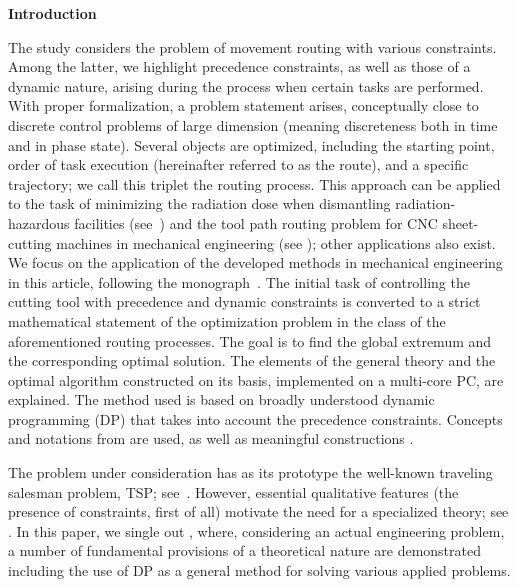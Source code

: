 \renewcommand{\theequation}{\arabic{section}.\arabic{equation}}

\newcommand{\pX}{{\mathcal X}}
\let\msf=\mathsf
\newcommand{\var}{\mathop{\sf Var}}
\setcounter{page}{1} %



\titleeng
\annotationandkeywordseng

\begin{flushleft}
  {\bf{Introduction}}
\end{flushleft}

The study considers the problem of movement routing
with various constraints.
Among the latter, we highlight
precedence constraints,
as well as those of a dynamic nature,
arising during the process when certain tasks are performed.
With proper formalization, a problem statement arises,
conceptually close to discrete control problems of large dimension
(meaning discreteness both in time and in phase state).
Several objects are optimized,
including the starting point,
order of task execution
(hereinafter referred to as the route),
and a specific trajectory;
we call this triplet
the routing process.
This approach can be applied
to the task of minimizing the radiation dose
when dismantling radiation-hazardous facilities
(see~\cite {1,3})
and the tool path routing problem
for CNC sheet-cutting machines
in mechanical engineering (see \cite {4,5});
other applications also exist.
We focus on the application of the developed methods in mechanical engineering
in this article,
following the monograph~\cite{4}.
The initial task of controlling the cutting tool
with precedence and dynamic constraints
is converted to a strict mathematical statement of
the optimization problem
in the class of the aforementioned routing processes.
The goal is to find
the global extremum and the corresponding optimal solution.
The elements of the general theory and
the optimal algorithm constructed on its basis,
implemented on a multi-core PC,
are explained.
The method used is based on
broadly understood dynamic programming
(DP)
that takes into account the precedence constraints.
Concepts and notations from
\cite[part II]{4}
are used,
as well as
meaningful constructions
\cite[part I]{4}.

The problem under consideration
has as its prototype the well-known
traveling salesman problem,
TSP;
see~\cite{7,8,9,10,11,12}.
However, essential qualitative features
(the presence of constraints, first of all)
motivate the need for a specialized theory;
see \cite {1,3,4,5,14}.
In this paper,
we single out \cite{4},
where, considering an actual engineering problem,
a number of fundamental provisions of a theoretical nature
are demonstrated including the use of DP
as a general method for solving various applied problems.

